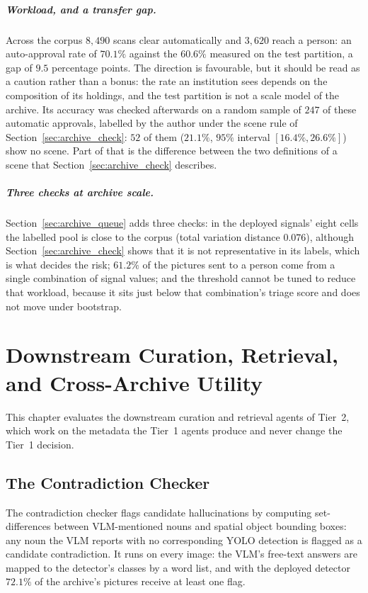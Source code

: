 \documentclass[12pt,a4paper]{report}
\begin{document}
\paragraph{Workload, and a transfer gap.} Across the corpus $8{,}490$ scans clear
automatically and $3{,}620$ reach a person: an auto-approval rate of $70.1\%$ against the
$60.6\%$ measured on the test partition, a gap of $9.5$ percentage points. The direction is
favourable, but it should be read as a caution rather than a bonus: the rate an institution
sees depends on the composition of its holdings, and the test partition is not a scale model
of the archive. Its accuracy was checked afterwards on a random sample of $247$ of these automatic approvals, labelled by the author under the scene rule of Section~\ref{sec:archive_check}: $52$ of them ($21.1\%$, $95\%$ interval $[16.4\%, 26.6\%]$) show no scene. Part of that is the difference between the two definitions of a scene that Section~\ref{sec:archive_check} describes.

\paragraph{Three checks at archive scale.} Section~\ref{sec:archive_queue} adds three checks: in the deployed signals' eight cells the labelled pool is close to the corpus (total variation distance $0.076$), although Section~\ref{sec:archive_check} shows that it is not representative in its labels, which is what decides the risk; $61.2\%$ of the pictures sent to a person come from a single combination of signal values; and the threshold cannot be tuned to reduce that workload, because it sits just below that combination's triage score and does not move under bootstrap.



\chapter{Downstream Curation, Retrieval, and Cross-Archive Utility}
\label{ch:downstream_utility}

This chapter evaluates the downstream curation and retrieval agents of Tier~2, which work on the metadata the Tier~1 agents produce and never change the Tier~1 decision.

\section{The Contradiction Checker}
\label{sec:agent2_contradiction}
The contradiction checker flags candidate hallucinations by computing set-differences between VLM-mentioned nouns and spatial object bounding boxes: any noun the VLM reports with no corresponding YOLO detection is flagged as a candidate contradiction. It runs on every image: the VLM's free-text answers are mapped to the detector's classes by a word list, and with the deployed detector $72.1\%$ of the archive's pictures receive at least one flag.
\end{document}
